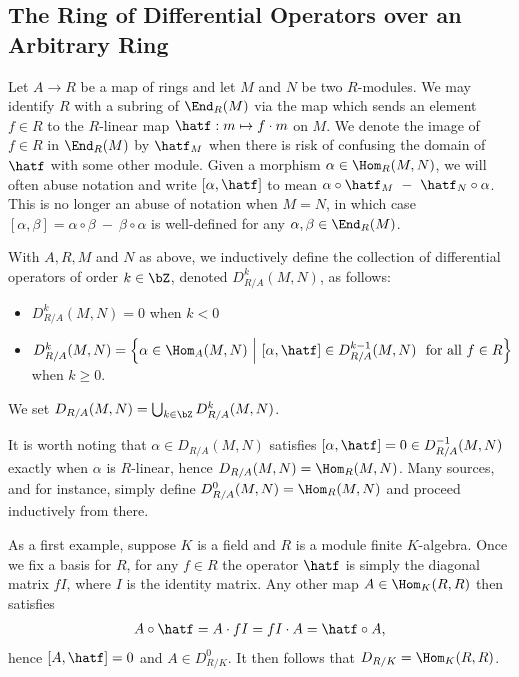 \subsection{The Ring of Differential Operators over an Arbitrary Ring}\label{sec:general-diff-ops}
Let $A\to R$ be a map of rings and let $M$ and $N$ be two $R$-modules. We may identify $R$ with a subring of $\End_R(M)$ via the map which sends an element $f \in R$ to the $R$-linear map $\hatf:m\mapsto f\cdot m$ on $M$. We denote the image of $f \in R$ in $\End_R(M)$ by $\hatf_M$ when there is risk of confusing the domain of $\hatf$ with some other module. Given a morphism $\alpha \in \Hom_R(M,N)$, we will often abuse notation and write $[\alpha, \hatf]$ to mean $\alpha \circ \hatf_M ~-~ \hatf_N\circ \alpha$. This is no longer an abuse of notation when $M = N$, in which case $[\alpha,\beta] = \alpha \circ \beta ~-~ \beta\circ\alpha$ is well-defined for any $\alpha, \beta \in \End_R(M)$.

\begin{defn}\label{defn:diff-ops}
	With $A,R,M$ and $N$ as above, we inductively define the collection of differential operators of order $k \in \bZ$, denoted $D^k_{R/A}(M,N)$, as follows:
	\begin{itemize}
		\item $D^k_{R/A}(M,N) = 0$ when $k < 0$
		\item $D^k_{R/A}(M,N) = \left\{\alpha \in \Hom_A(M,N) ~\middle|~ \left[\alpha,\hatf\right] \in D^{k-1}_{R/A}(M,N) ~ \text{ for all } f\in R\right\} $ when $k \geq 0$.
	\end{itemize}
	We set $D_{R/A}(M,N) = \bigcup_{k\in \bZ} D^k_{R/A}(M,N)$.
\end{defn}
\begin{rmk}\label{rmk:starting-index-of-diff-op-def}
	It is worth noting that $\alpha \in D_{R/A}(M,N)$ satisfies $[\alpha,\hatf] = 0 \in D^{-1}_{R/A}(M,N)$ exactly when $\alpha$ is $R$-linear, hence $D_{R/A}(M,N) = \Hom_R(M,N)$. Many sources, \cite{ginzburg_d-mod} and \cite{bernstein_d-mod} for instance, simply define $D^0_{R/A}(M,N) = \Hom_{R}(M,N)$ and proceed inductively from there.
\end{rmk}

\begin{example}\label{example:module-finite-K-alg-diff-ops}
	As a first example, suppose $K$ is a field and $R$ is a module finite $K$-algebra. Once we fix a basis for $R$, for any $f \in R$ the operator $\hatf$ is simply the diagonal matrix $fI$, where $I$ is the identity matrix. Any other map $A \in \Hom_K(R,R)$ then satisfies
	\begin{align*}
		A\circ \hatf = A\cdot fI = fI\cdot A = \hatf\circ A,
	\end{align*}
	hence $[A,\hatf] = 0$ and $A \in D^0_{R/K}$. It then follows that $D_{R/K} = \Hom_K(R,R)$.
\end{example}

